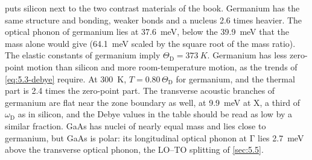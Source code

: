  puts silicon next to the two contrast materials of the book. Germanium has the same structure and bonding, weaker bonds and a nucleus 2.6 times heavier. The optical phonon of germanium lies at \SI{37.6}{meV}, below the \SI{39.9}{meV} that the mass alone would give (\SI{64.1}{meV} scaled by the square root of the mass ratio). The elastic constants of germanium imply $\Theta_{\mathrm{D}} = \SI{373}{K}$. Germanium has less zero-point motion than silicon and more room-temperature motion, as the trends of \cref{eq:5.3-debye} require. At \SI{300}{K}, $T = 0.80\,\Theta_{\mathrm{D}}$ for germanium, and the thermal part is 2.4 times the zero-point part. The transverse acoustic branches of germanium are flat near the zone boundary as well, at \SI{9.9}{meV} at X, a third of $\omega_{\mathrm{D}}$ as in silicon, and the Debye values in the table should be read as low by a similar fraction. GaAs has nuclei of nearly equal mass and lies close to germanium, but GaAs is polar: its longitudinal optical phonon at $\mathrm{\Gamma}$ lies \SI{2.7}{meV} above the transverse optical phonon, the LO--TO splitting of \cref{sec:5.5}.

